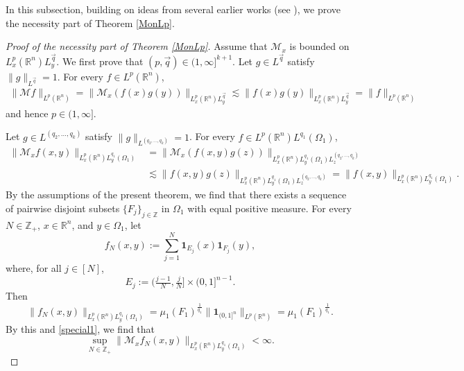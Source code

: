 \documentclass[11pt, reqno]{amsart}
\theoremstyle{definition}
\theoremstyle{remark}
\numberwithin{equation}{section}
\newcommand{\Z}{\mathbb Z}
\newcommand{\vq}{\vec q}
\begin{document}
In this subsection, building on ideas from several earlier works
(see \cite{GMT93,NVW15,Ste93}), we prove
the necessity part of Theorem \ref{MonLp}.

\begin{proof}[Proof of the necessity part of Theorem \ref{MonLp}]
Assume that $\mathcal M_x$ is bounded on $L^p_x(\mathbb R^n)L^{\vq}_y$.
We first prove that $(p,\vec q)\in(1,\infty]^{k+1}$.
Let $g\in L^{\vq}$ satisfy $\|g\|_{L^{\vq}}=1$.
For every $f\in L^p(\mathbb R^n)$,
\begin{align*}
\|\mathcal Mf\|_{L^p(\mathbb R^n)}
=\|\mathcal M_x(f(x)g(y))\|_{L^p_x(\mathbb R^n)L^{\vq}_y}
\lesssim \|f(x)g(y)\|_{L^p_x(\mathbb R^n)L^{\vq}_y}
= \|f\|_{L^p(\mathbb R^n)}
\end{align*}
and hence $p\in(1,\infty]$.

Let $g\in L^{(q_2,\ldots,q_k)}$ satisfy $\|g\|_{L^{(q_2,\ldots,q_k)}}=1$.
For every $f\in L^p(\mathbb R^n)L^{q_1}(\Omega_1)$,
\begin{equation}\label{special1}
\begin{split}
\|\mathcal M_xf(x,y)\|_{L^p_x(\mathbb R^n)L^{q_1}_y(\Omega_1)}
&=\|\mathcal M_x(f(x,y)g(z))\|_{L^p_x(\mathbb R^n)L^{q_1}_y(\Omega_1)L^{(q_2,\ldots,q_k)}_z}\\
&\lesssim \|f(x,y)g(z)\|_{L^p_x(\mathbb R^n)L^{q_1}_y(\Omega_1)L^{(q_2,\ldots,q_k)}_z}
= \|f(x,y)\|_{L^p_x(\mathbb R^n)L^{q_1}_y(\Omega_1)}.
\end{split}\end{equation}
By the assumptions of the present theorem, we find that there exists a sequence
of pairwise disjoint subsets $\{F_j\}_{j\in\mathbb Z}$ in $\Omega_1$ with equal positive measure.
For every $N\in\Z_+$, $x\in\mathbb R^n$, and $y\in\Omega_1$, let
$$
f_N(x,y):=\sum_{j=1}^N
\mathbf{1}_{E_j}(x)
\mathbf{1}_{F_j}(y),
$$
where, for all $j\in[N]$,
$$
E_j:=\Big(\tfrac{j-1}{N},\tfrac{j}{N}\Big]
\times (0,1]^{n-1}.
$$
Then
$$
\|f_N(x,y)\|_{L^p_x(\mathbb R^n)L^{q_1}_y(\Omega_1)}
=\mu_1(F_1)^{\frac1{q_1}}\|\mathbf{1}_{(0,1]^n}\|_{L^p(\mathbb R^n)}
=\mu_1(F_1)^{\frac1{q_1}}.
$$
By this and \eqref{special1}, we find that
\begin{equation}\label{<infty1}
\sup_{N\in\Z_+} \|\mathcal M_xf_N(x,y)\|_{L^p_x(\mathbb R^n)L^{q_1}_y(\Omega_1)}<\infty.
\end{equation}


\end{proof}
\end{document}
